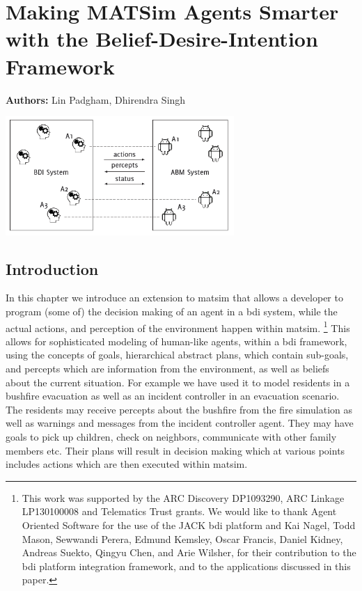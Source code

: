 \chapter{Making MATSim Agents Smarter with the Belief-Desire-Intention Framework}
\label{ch:bdi}

\hfill \textbf{Authors:} Lin Padgham, Dhirendra Singh

\begin{center} \includegraphics[width=0.65\textwidth, angle=0]{extending/figures/bdi/title.png} \end{center}



\section{Introduction}
\label{sec:bdi-intro}
In this chapter we introduce an extension to \gls{matsim} that allows a
developer to program (some of) the decision making of an agent in a \gls{bdi} system, while the actual actions, and
perception of the environment happen within \gls{matsim}.
\footnote{This work was supported by the ARC Discovery DP1093290,  ARC Linkage LP130100008 and Telematics Trust grants. We would like to thank Agent Oriented Software for the use of the JACK \gls{bdi} platform and Kai Nagel, Todd Mason, Sewwandi Perera, Edmund Kemsley, Oscar Francis, Daniel Kidney, Andreas Suekto, Qingyu Chen, and Arie Wilsher, for their contribution to the \gls{bdi} platform integration framework, and to the applications discussed in this paper.} 
This allows for
sophisticated modeling of human-like agents, within a \gls{bdi}
framework, using the concepts of goals, hierarchical abstract plans,
which contain sub-goals, and percepts which are information from the
environment, as well as beliefs about the current situation. For
example we have used it to model residents in a 
bushfire evacuation as well as an incident controller in an evacuation
scenario. The residents may receive percepts about the bushfire from
the fire simulation as well as warnings and messages from the incident
controller agent. They may
have goals to pick up children, check on neighbors, communicate with
other family members etc. Their plans will result in
decision making which at various points includes actions which are then
executed within \gls{matsim}.

